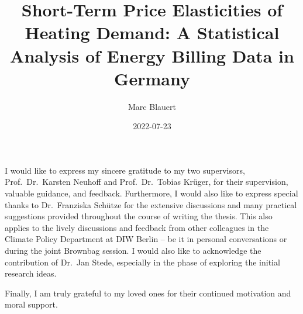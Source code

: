 \documentclass[12pt,twoside]{reedthesis}
\title{Short-Term Price Elasticities of Heating Demand: A Statistical Analysis of Energy Billing Data in Germany}
\author{Marc Blauert}
\date{2022-07-23}
\begin{document}
  \maketitle

\frontmatter %
\pagestyle{empty} %
  \begin{acknowledgements}
    I would like to express my sincere gratitude to my two supervisors, Prof.~Dr.~Karsten Neuhoff and Prof.~Dr.~Tobias Krüger, for their supervision, valuable guidance, and feedback. Furthermore, I would also like to express special thanks to Dr.~Franziska Schütze for the extensive discussions and many practical suggestions provided throughout the course of writing the thesis. This also applies to the lively discussions and feedback from other colleagues in the Climate Policy Department at DIW Berlin -- be it in personal conversations or during the joint Brownbag session. I would also like to acknowledge the contribution of Dr.~Jan Stede, especially in the phase of exploring the initial research ideas.

    \par

    Finally, I am truly grateful to my loved ones for their continued motivation and moral support.

    \par
  \end{acknowledgements}

  \hypersetup{linkcolor=black}
  \setcounter{secnumdepth}{2}
  \setcounter{tocdepth}{2}
  \tableofcontents

  \listoftables
\end{document}
